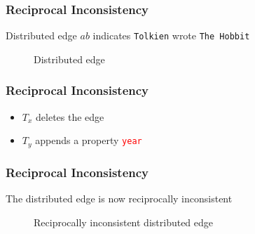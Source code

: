 \begin{frame}
  \frametitle{Reciprocal Inconsistency}
  Distributed edge $ab$ indicates \texttt{Tolkien} wrote \texttt{The Hobbit}
  \begin{figure}
    \centering
    
    \caption{Distributed edge}
  \end{figure}
\end{frame}

\begin{frame}
  \frametitle{Reciprocal Inconsistency}
  \begin{itemize}
  \item $T_x$ deletes the edge
  \item $T_y$ appends a property \textcolor{red}{\texttt{year}}
  \end{itemize}

  \begin{figure}
    \centering
  \end{figure}
\end{frame}

\begin{frame}
  \frametitle{Reciprocal Inconsistency}
  The distributed edge is now reciprocally inconsistent
  \begin{figure}
    \centering
    
    \caption{Reciprocally inconsistent distributed edge}
  \end{figure}
\end{frame}


